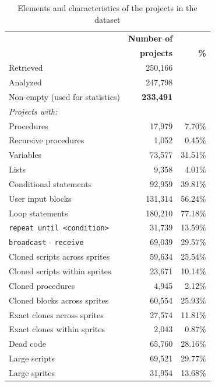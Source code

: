 \documentclass{sig-alternate}
\begin{document}
\begin{table}[ht]
	\centering
	\begin{tabular}{lrr}
		\hline
		&\textbf{Number of}&\\
		&\textbf{projects}& \textbf{\%}\\
		\hline
		Retrieved & 250,166 & \\
		Analyzed & 247,798 & \\
		Non-empty (used for statistics) & \textbf{233,491} & \\
		\hline
		\textit{Projects with:} & & \\

		Procedures & 17,979 & 7.70\%\\
		Recursive procedures &  1,052 & 0.45\%\\
		Variables & 73,577 & 31.51\% \\
		Lists & 9,358 & 4.01\% \\
		Conditional statements & 92,959 & 39.81\% \\
		User input blocks& 131,314 & 56.24\% \\
		Loop statements & 180,210 & 77.18\% \\
		\texttt{repeat until <condition>} & 31,739 & 13.59\% \\
		\texttt{broadcast} - \texttt{receive} & 69,039 & 29.57\%\\
		Cloned scripts across sprites & 59,634 & 25.54\% \\
		Cloned scripts within sprites & 23,671 & 10.14\%\\
		Cloned procedures & 4,945 & 2.12\%\\
		Cloned blocks across sprites & 60,554 & 25.93\%\\
		Exact clones across sprites & 27,574 & 11.81\%\\
		Exact clones within sprites & 2,043 & 0.87\%\\
		Dead code & 65,760 & 28.16\%\\
		Large scripts & 69,521 & 29.77\%\\
		Large sprites & 31,954 & 13.68\%\\		
		\hline
	\end{tabular}
	\caption{Elements and characteristics of the projects in the dataset}
	\label{tbl-characteristics}
\end{table}
\end{document}

